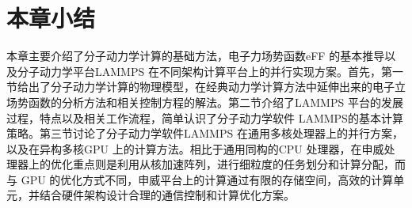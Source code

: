 \section{本章小结}
本章主要介绍了分子动力学计算的基础方法，电子力场势函数eFF 的基本推导以及分子动力学平台LAMMPS 在不同架构计算平台上的并行实现方案。首先，第一节给出了分子动力学计算的物理模型，在经典动力学计算方法中延伸出来的电子立场势函数的分析方法和相关控制方程的解法。第二节介绍了LAMMPS 平台的发展过程，特点以及相关工作流程，简单认识了分子动力学软件 LAMMPS的基本计算策略。第三节讨论了分子动力学软件LAMMPS 在通用多核处理器上的并行方案，以及在异构多核GPU 上的计算方法。相比于通用同构的CPU 处理器，在申威处理器上的优化重点则是利用从核加速阵列，进行细粒度的任务划分和计算分配，而与 GPU 的优化方式不同，申威平台上的计算通过有限的存储空间，高效的计算单元，并结合硬件架构设计合理的通信控制和计算优化方案。

